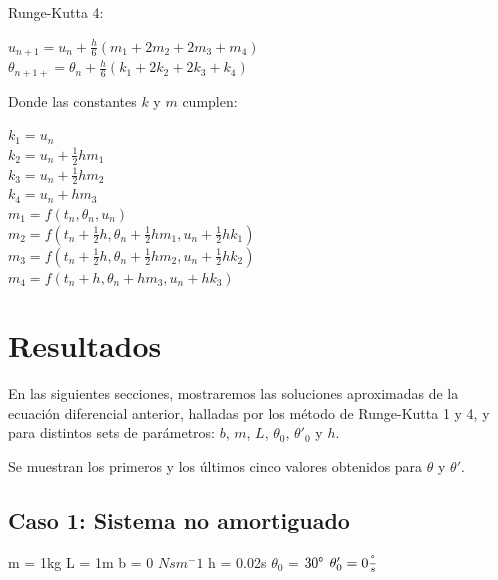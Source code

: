 \documentclass[titlepage,a4paper]{article}
\begin{document}
    Runge-Kutta 4:
    
    \begin{center}
        $u_{n+1} = u_{n} + \frac{h}{6} ( m_1 + 2m_2 + 2m_3 + m_4)$\\
        $\theta_{n+1+} = \theta_{n} + \frac{h}{6}  ( k_1 + 2k_2 + 2k_3 + k_4)$
    \end{center}
    
    Donde las constantes $k$ y $m$ cumplen:
    
    \begin{multicols}{2}
    \centering
    $k_1 = u_n$\\
    $k_2 = u_n + \frac{1}{2}hm_1$\\
    $k_3 = u_n + \frac{1}{2}hm_2$\\
    $k_4 = u_n + hm_3$\\
    \columnbreak
    $m_1 = f(t_n, \theta_n, u_n)$\\
    $m_2 = f(t_n +\frac{1}{2}h, \theta_n+\frac{1}{2}hm_1, u_n+\frac{1}{2}hk_1)$ \\
    $m_3 = f(t_n +\frac{1}{2}h, \theta_n+\frac{1}{2}hm_2, u_n+\frac{1}{2}hk_2)$ \\
    $m_4 = f(t_n +h, \theta_n+hm_3, u_n+hk_3)$ \\
    \end{multicols}

\newpage

\section{Resultados}

    En las siguientes secciones, mostraremos las soluciones aproximadas de la ecuación diferencial anterior, halladas por los método de Runge-Kutta 1 y 4, y para distintos sets de parámetros: $b$, $m$, $L$, $\theta_0$, $\theta'_0$ y $h$.
    
    Se muestran los primeros y los últimos cinco valores obtenidos para $\theta$ y $\theta'$.
    
    \subsection{Caso 1: Sistema no amortiguado}
    
    \begin{center}
        m = 1kg \hspace{3mm}
        L = 1m \hspace{3mm}
        b = 0 $Nsm^-1$ \hspace{3mm}
        h = 0.02s \hspace{3mm}
        $\theta_0$ = $30\degree$ \hspace{3mm}
        $\theta'_0 = 0\frac{\degree}{s}$ \hspace{3mm}
    \end{center}
    
\end{document}
